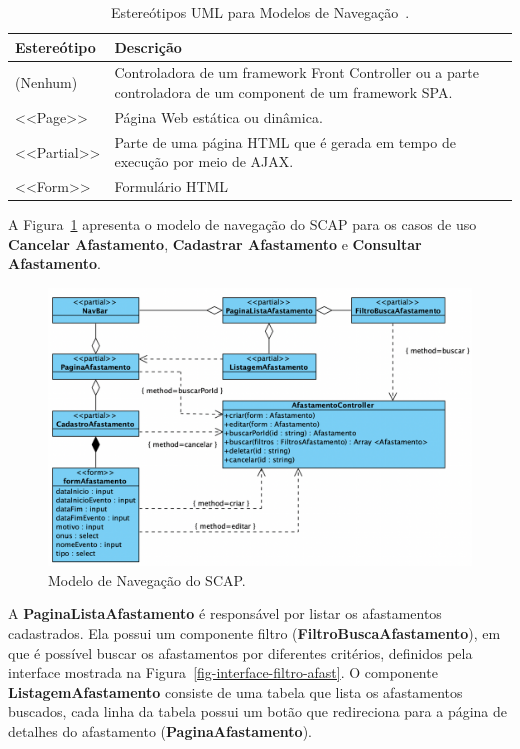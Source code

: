 \begin{table}[h!]
    \centering
    \caption{Estereótipos UML para Modelos de Navegação~\cite{hoppe:2023}.}
    \label{tab-estereotipos-navegacao}
    \begin{tabular}{|p{3cm}|p{12cm}|}
        \hline
        \textbf{Estereótipo} & \textbf{Descrição} \\
        \hline
        (Nenhum)    & Controladora de um framework Front Controller ou a parte controladora de um component de um framework SPA. \\
        \hline
        <<Page>>    & Página Web estática ou dinâmica. \\
        \hline
        <<Partial>> & Parte de uma página HTML que é gerada em tempo de execução por meio de AJAX. \\
        \hline
        <<Form>>    & Formulário HTML \\
        \hline
    \end{tabular}
\end{table}

A Figura~\ref{fig-modelo-navegacao-afast} apresenta o modelo de navegação do SCAP para os casos de uso
\textbf{Cancelar Afastamento}, \textbf{Cadastrar Afastamento} e \textbf{Consultar Afastamento}.

\begin{figure}
    \centering
    \includegraphics[width=1\textwidth]{figuras/fig-modelo-naveg-afast.png}
    \caption{Modelo de Navegação do SCAP.}
    \label{fig-modelo-navegacao-afast}
\end{figure}

A \textbf{PaginaListaAfastamento} é responsável por listar os afastamentos cadastrados.
Ela possui um componente filtro (\textbf{FiltroBuscaAfastamento}), em que é possível buscar
os afastamentos por diferentes critérios, definidos pela interface mostrada na Figura~\ref{fig-interface-filtro-afast}.
O componente \textbf{ListagemAfastamento} consiste de uma tabela que lista os afastamentos buscados,
cada linha da tabela possui um botão que redireciona para a página de detalhes do afastamento (\textbf{PaginaAfastamento}).

